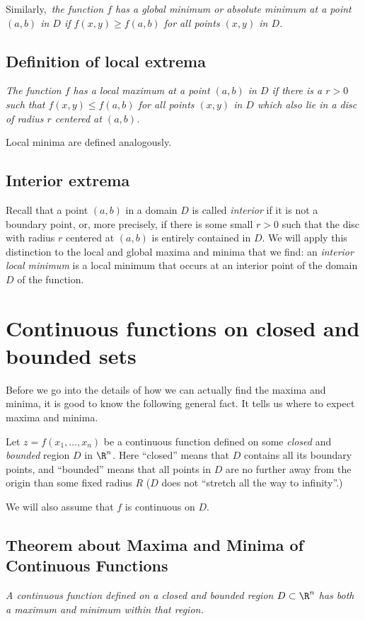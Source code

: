 \upshape%
Similarly,\itshape\ the function $f$ has a \emph{global minimum} or
\emph{absolute minimum} at a point $(a,b)$ in $D$ if $f(x,y)\geq f(a,b)$ for all
points $(x,y)$ in $D$.

\subsection{Definition of local extrema}     

\label{sec:def-local-extrema}\itshape 
The function $f$ has a \emph{local maximum} at a point $(a,b)$ in $D$ if there
is a $r>0$ such that $f(x,y)\leq f(a,b)$ for all points $(x,y)$ in $D$ which
also lie in a disc of radius $r$ centered at $(a,b)$.  \upshape

Local minima are defined analogously.

\subsection{Interior extrema}     

\label{sec:interior-extrema} 
Recall that a point $(a,b)$ in a domain $D$ is called \emph{interior} if it is
not a boundary point, or, more precisely, if there is some small $r>0$ such that
the disc with radius $r$ centered at $(a,b)$ is entirely contained in $D$.  We
will apply this distinction to the local and global maxima and minima that we
find: an \emph{interior local minimum} is a local minimum that occurs at an
interior point of the domain $D$ of the function.


\section{Continuous functions on closed and bounded sets}     
Before we go into the details of how we can actually find the maxima and minima,
it is good to know the following general fact. It tells us where to expect
maxima and minima.

Let $z=f(x_1,\ldots,x_n)$ be a continuous function defined on some \emph{closed} and
\emph{bounded} region $D$ in $\R^n$.  Here ``closed'' means that $D$ contains all its
boundary points, and ``bounded'' means that all points in $D$ are no further away
from the origin than some fixed radius $R$ ($D$ does not ``stretch all the way to
infinity''.)

We will also assume that $f$ is continuous on $D$.

\subsection{Theorem about Maxima and Minima of Continuous Functions}     
\label{thm:maxmin-exist}%
\itshape%
A continuous function defined on a closed and bounded region $D\subset \R^n$ has
both a maximum and minimum within that region.  \upshape

